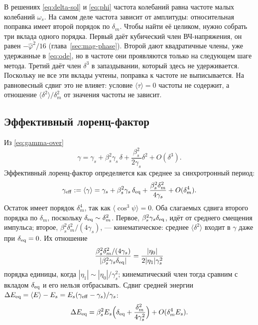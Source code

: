 В решениях \eqref{eq:delta-sol} и \eqref{eq:phi} частота колебаний равна частоте малых колебаний $\omega_s$. На самом деле частота зависит от амплитуды: относительная поправка имеет второй порядок по $\delta_m$. Чтобы найти её целиком, нужно собрать три вклада одного порядка. Первый даёт кубический член ВЧ-напряжения, он равен $-\hat\varphi^2/16$ (глава~\ref{sec:mag-phase}). Второй дают квадратичные члены, уже удержанные в \eqref{eq:ode}, но в частоте они проявляются только на следующем шаге метода. Третий даёт член $\delta^3$ в запаздывании, который здесь не удерживается. Поскольку не все эти вклады учтены, поправка к частоте не выписывается. На равновесный сдвиг это не влияет: условие $\langle\tau\rangle=0$ частоты не содержит, а отношение $\langle\delta^2\rangle/\delta_m^2$ от значения частоты не зависит.

\subsection{Эффективный лоренц-фактор}

Из \eqref{eq:gamma-over}
\begin{equation}
\label{eq:gamma-delta}
\gamma
=\gamma_s+\beta_s^2\gamma_s\,\delta
+\frac{\beta_s^2}{2\gamma_s}\delta^2+O(\delta^3).
\end{equation}
Эффективный лоренц-фактор определяется как среднее за синхротронный период:
\begin{equation}
\label{eq:gamma-eff}
\gamma_{\mathrm{eff}}
:=\langle\gamma\rangle
=\gamma_s+\beta_s^2\gamma_s\,\delta_{\mathrm{eq}}
+\frac{\beta_s^2\delta_m^2}{4\gamma_s}
+O(\delta_m^4).
\end{equation}
Остаток имеет порядок $\delta_m^4$, так как $\langle\cos^3\psi\rangle=0$. Оба слагаемых сдвига второго порядка по $\delta_m$, поскольку $\delta_{\mathrm{eq}}\sim\delta_m^2$. Первое, $\beta_s^2\gamma_s\delta_{\mathrm{eq}}$, идёт от среднего смещения импульса; второе, $\beta_s^2\delta_m^2/(4\gamma_s)$, --- кинематическое: среднее $\langle\delta^2\rangle$ входит в $\gamma$ даже при $\delta_{\mathrm{eq}}=0$. Их отношение
\begin{equation*}
\frac{\beta_s^2\delta_m^2/(4\gamma_s)}{|\beta_s^2\gamma_s\delta_{\mathrm{eq}}|}
=\frac{|\eta_0|}{2|\eta_1|\gamma_s^2}
\end{equation*}
порядка единицы, когда $|\eta_1|\sim|\eta_0|/\gamma_s^2$; кинематический член тогда сравним с вкладом $\delta_{\mathrm{eq}}$ и его нельзя отбрасывать. Сдвиг средней энергии $\Delta E_{\mathrm{eq}}=\langle E\rangle-E_s=E_s(\gamma_{\mathrm{eff}}-\gamma_s)/\gamma_s$:
\begin{equation}
\label{eq:dE-eq}
\Delta E_{\mathrm{eq}}
=\beta_s^2E_s\Bigl(\delta_{\mathrm{eq}}+\frac{\delta_m^2}{4\gamma_s^2}\Bigr)
+O(\delta_m^4 E_s).
\end{equation}


